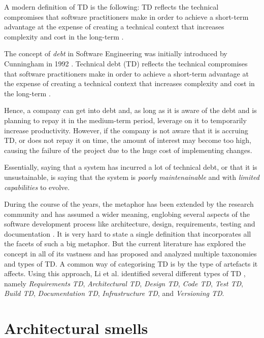 A modern definition of TD is the following: TD reflects the technical compromises that software practitioners make in order to achieve a short-term advantage at the expense of creating a technical context that increases complexity and cost in the long-term \cite{Avgeriou2016}. 

The concept of \textit{debt} in Software Engineering was initially introduced by Cunningham in 1992 \cite{Cunningham1992}.
Technical debt (TD) reflects the technical compromises that software practitioners make in order to achieve a short-term advantage at the expense of creating a technical context that increases complexity and cost in the long-term \cite{Avgeriou2016}.  

Hence, a company can get into debt and, as long as it is aware of the debt and is planning to repay it in the medium-term period, leverage on it to temporarily increase productivity.
However, if the company is not aware that it is accruing TD, or does not repay it on time, the amount of interest may become too high, causing the failure of the project due to the huge cost of implementing changes.

Essentially, saying that a system has incurred a lot of technical debt, or that it is unsustainable, is saying that the system is \emph{poorly maintenainable} and with \emph{limited capabilities} to evolve. 

During the course of the years, the metaphor has been extended by the research community and has assumed a wider meaning, englobing several aspects of the software development process like architecture, design, requirements, testing and documentation \cite{brown_managing_2010}.
It is very hard to state a single definition that incorporates all the facets of such a big metaphor. 
But the current literature has explored the concept in all of its vastness and has proposed and analyzed multiple taxonomies and types of TD.
A common way of categorising TD is by the type of artefacts it affects. Using this approach, Li et al. identified several different types of TD \cite{li_systematic_2015}, namely \emph{Requirements TD}, \emph{Architectural TD}, \emph{Design TD}, \emph{Code TD}, \emph{Test TD}, \emph{Build TD}, \emph{Documentation TD}, \emph{Infrastructure TD}, and \emph{Versioning TD}.



\section{Architectural smells}

